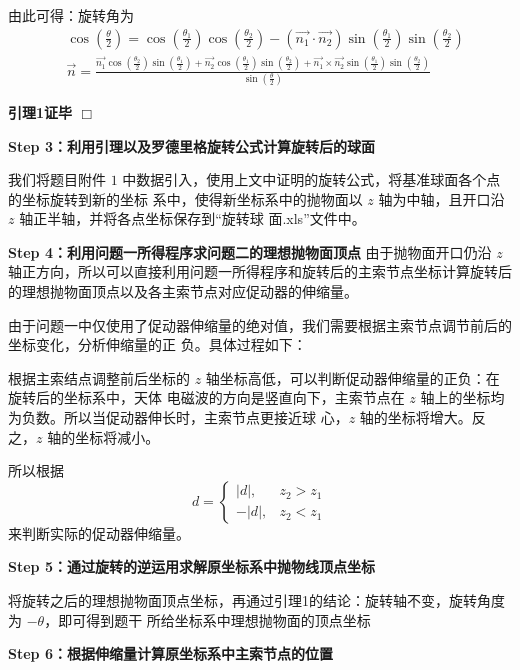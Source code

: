 \documentclass[withoutpreface,bwprint]{cumcmthesis} %
\begin{document}
由此可得：旋转角为
\[
    \begin{split}
        &\cos(\frac{\theta}{2}) = \cos(\frac{\theta _1}{2})
        \cos(\frac{\theta _2}{2}) - (\overrightarrow{n_1} \cdot 
        \overrightarrow{n_2})\sin(\frac{\theta _1}{2})
        \sin(\frac{\theta _2}{2}) \\
        &\overrightarrow{n} = \frac{\displaystyle \overrightarrow{n_1}
        \cos(\frac{\theta _2}{2})\sin(\frac{\theta _1}{2}) + 
        \overrightarrow{n_2}\cos(\frac{\theta _1}{2})
        \sin(\frac{\theta _2}{2}) + \overrightarrow{n_1} \times 
        \overrightarrow{n_2}\sin(\frac{\theta _1}{2})
        \sin(\frac{\theta _2}{2})}
        {\displaystyle \sin(\frac{\theta}{2})} 
    \end{split}
\]\par
\textbf{引理1证毕 $\Box$}

\medskip
\medskip
\medskip
\textbf{Step 3：利用引理以及罗德里格旋转公式计算旋转后的球面}

我们将题目附件 $1$ 中数据引入，使用上文中证明的旋转公式，将基准球面各个点的坐标旋转到新的坐标
系中，使得新坐标系中的抛物面以 $z$ 轴为中轴，且开口沿 $z$ 轴正半轴，并将各点坐标保存到“旋转球
面.xls”文件中。

\textbf{Step 4：利用问题一所得程序求问题二的理想抛物面顶点}
由于抛物面开口仍沿 $z$ 轴正方向，所以可以直接利用问题一所得程序和旋转后的主索节点坐标计算旋转后
的理想抛物面顶点以及各主索节点对应促动器的伸缩量。

由于问题一中仅使用了促动器伸缩量的绝对值，我们需要根据主索节点调节前后的坐标变化，分析伸缩量的正
负。具体过程如下：

根据主索结点调整前后坐标的 $z$ 轴坐标高低，可以判断促动器伸缩量的正负：在旋转后的坐标系中，天体
电磁波的方向是竖直向下，主索节点在 $z$ 轴上的坐标均为负数。所以当促动器伸长时，主索节点更接近球
心，$z$ 轴的坐标将增大。反之，$z$ 轴的坐标将减小。

所以根据
\[
    d = 
    \left\{
        \begin{array}{rl}
            |d|,&z_2>z_1 \\
            -|d|,&z_2<z_1
        \end{array}
    \right.
\]
来判断实际的促动器伸缩量。

\textbf{Step 5：通过旋转的逆运用求解原坐标系中抛物线顶点坐标}

将旋转之后的理想抛物面顶点坐标，再通过引理1的结论：旋转轴不变，旋转角度为 $-\theta$，即可得到题干
所给坐标系中理想抛物面的顶点坐标

\textbf{Step 6：根据伸缩量计算原坐标系中主索节点的位置}
\end{document}

